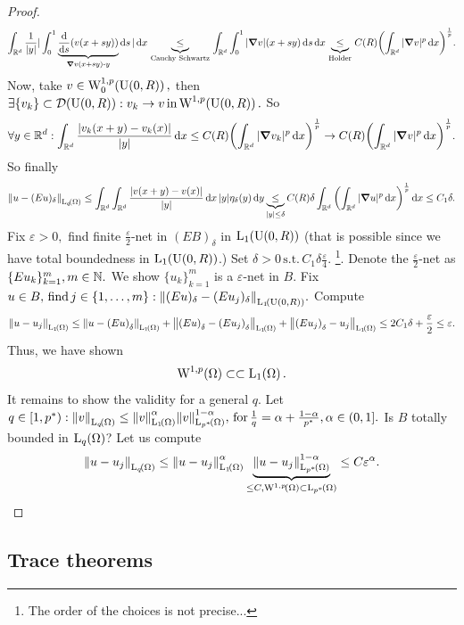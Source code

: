 \documentclass{article}
\begin{document}
\begin{proof}
	\[
		\int_{\R^d}\frac{1}{|y|}|\int_{0}^1 \underbrace{\dv{s} \qty(v(x+sy))}_{\grad v\qty(x+sy) \vdot y}\dd{s}|\dd{x} \underbrace{\leq}_{\, \text{Cauchy Schwartz} \,} \int_{\R^d}\int_{0}^1 |\grad v| (x+sy)\dd{s}\dd{x} \underbrace{\leq}_{\, \text{Holder} \,} C(R)\qty(\int_{\R^d}|\grad v|^p \dd{x})^{\frac{1}{p}}.
	\]
	Now, take $v \in \WkpzeroSet[1][p]{\text{U}(0,R)}, $ then $\exists \{v_k\} \subset \mathcal{D}\qty(\text{U}(0,R)): v_k \to v \, \text{in} \, \WkpSet[1][p]{\text{U}(0,R)}.$ So
	\[
		\forall y \in {\mathbb R}^d: \int_{{\mathbb R}^d}\frac{|v_k(x+y)-v_k(x)|}{|y|}\dd{x}\leq C(R) \qty(\int_{{\mathbb R}^d}|\grad v_k|^p\dd{x})^{\frac{1}{p}} \to C(R)\qty(\int_{{\mathbb R}^d}|\grad v|^p\dd{x})^{\frac{1}{p}}.
	\]
	So finally
	\[
		\norm{u-(Eu)_{\delta}}_{\LpSet[q]{\Omega}} \leq \int_{\R^d}\int_{\R^d}\frac{|v(x+y)-v(x)|}{|y|}\dd{x} |y| \eta_{\delta}(y)\dd{y} \underbrace{\leq}_{|y|\leq \delta} C(R) \delta \int_{\R^d}\qty(\int_{\R^d}|\grad u|^p \dd{x})^{\frac{1}{p}}\dd{x} \leq C_1 \delta.
	\]
	Fix $\varepsilon >0, $ find finite $\frac{\varepsilon}{2}$-net in $(EB)_{\delta}$ in $\LpSet[1]{\text{U}(0,R)}$ (that is possible since we have total boundedness in $\LpSet[1]{\text{U}(0,R)}$.) Set $\delta >0 \, \text{s.t.} \, C_1 \delta \frac{\varepsilon}{4}.$ \footnote{The order of the choices is not precise...}. Denote the $\frac{\varepsilon}{2}$-net as $\{Eu_k\}_{k=1}^{m}, m \in {\mathbb N}.$ We show $\{u_k\}_{k=1}^{m}$ is a $\varepsilon$-net in $B$. Fix $u \in B, \, \text{find} \, j \in \{1,\dots,m\}: \norm{(Eu)_{\delta}-(Eu_j)_{\delta}}_{\LpSet[1]{\text{U}(0,R)}}.$ Compute
	\[
		\norm{u-u_j}_{\LpSet[1]{\Omega}} \leq \norm{u-\qty(Eu)_{\delta}}_{\LpSet[1]{\Omega}} + \norm{\qty(Eu)_{\delta}-\qty(Eu_j)_{\delta}}_{\LpSet[1]{\Omega}}+ \norm{\qty(Eu_j)_{\delta}-u_j}_{\LpSet[1]{\Omega}}\leq 2C_1 \delta + \frac{\varepsilon}{2} \leq \varepsilon.
	\]
	Thus, we have shown
	\[
		\WkpSet[1][p]{\Omega} \subset \subset \LpSet[1]{\Omega}.
	\]
	It remains to show the validity for a general $q$. Let $q \in [1,p^{*}): \norm{v}_{\LpSet[q]{\Omega}} \leq \norm{v}_{\LpSet[1]{\Omega}}^\alpha \norm{v}_{\LpSet[p^{*}]{\Omega}}^{1-\alpha}, \, \text{for} \, \frac{1}{q}=\alpha + \frac{1-\alpha}{p^{*}}, \alpha \in (0,1].$ Is $B$ totally bounded in $\LpSet[q]{\Omega}$? Let us compute
	\[
		\norm{u-u_j}_{\LpSet[q]{\Omega}}\leq \norm{u-u_j}_{\LpSet[1]{\Omega}}^\alpha \underbrace{\norm{u-u_j}_{\LpSet[p^{*}]{\Omega}}^{1-\alpha}}_{\leq C, \WkpSet[1][p]{\Omega}\subset \LpSet[p^{*}]{\Omega}}\leq C \varepsilon^\alpha.
	\]
\end{proof}

\subsection{Trace theorems}
\label{sec:traces}
\end{document}
